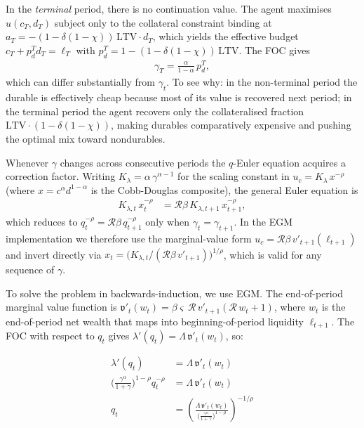 \documentclass[\econtexMain]{subfiles}
\begin{document}
In the \emph{terminal} period, there is no continuation value.  The agent
maximises $u(c_T, d_T)$ subject only to the collateral constraint binding at
$a_T = -(1-\delta(1-\chi))\,\mathrm{LTV}\cdot d_T$, which yields the effective
budget $c_T + p_d^T d_T = \ell_T$ with $p_d^T = 1-(1-\delta(1-\chi))\,\mathrm{LTV}$.  The FOC gives
\begin{align}
	\gamma_T = \frac{\alpha}{1-\alpha}\, p_d^T,
\end{align}
which can differ substantially from $\gamma_t$.  To see why: in the non-terminal
period the durable is effectively cheap because most of its value is recovered
next period; in the terminal period the agent recovers only the collateralised
fraction $\mathrm{LTV}\cdot(1-\delta(1-\chi))$, making durables comparatively
expensive and pushing the optimal mix toward nondurables.

Whenever $\gamma$ changes across consecutive periods the $q$-Euler equation
acquires a correction factor.  Writing $K_\lambda = \alpha\,\gamma^{\alpha-1}$
for the scaling constant in $u_c = K_\lambda\, x^{-\rho}$ (where
$x = c^\alpha d^{1-\alpha}$ is the Cobb-Douglas composite), the general Euler
equation is
\begin{align}
	K_{\lambda,t}\, x_t^{-\rho} &= \mathcal{R}\beta\, K_{\lambda,t+1}\, x_{t+1}^{-\rho},
\end{align}
which reduces to $q_t^{-\rho}=\mathcal{R}\beta\,q_{t+1}^{-\rho}$ only when
$\gamma_t = \gamma_{t+1}$.  In the EGM implementation we therefore use the
marginal-value form $u_c = \mathcal{R}\beta\,v'_{t+1}(\ell_{t+1})$ and invert
directly via $x_t = \bigl(K_{\lambda,t}/(\mathcal{R}\beta\,v'_{t+1})\bigr)^{1/\rho}$,
which is valid for any sequence of $\gamma$.

To solve the problem in backwards-induction, we use EGM. The end-of-period marginal value function is $\mathfrak{v}'_t(w_t) = \beta\varsigma\,\mathcal{R}\,v'_{t+1}(\mathcal{R}\,w_t + 1)$, where $w_t$ is the end-of-period net wealth that maps into beginning-of-period liquidity $\ell_{t+1}$. The FOC with respect to $q_t$ gives $\lambda'(q_t) = \Lambda\,\mathfrak{v}'_t(w_t)$, so:

\begin{align}
	\lambda'(q_t) &= \Lambda\,\mathfrak{v}'_t(w_t)\\
	\Big(\frac{\gamma^\alpha}{1+\gamma}\Big)^{1-\rho} q_t^{-\rho} &= \Lambda\,\mathfrak{v}'_t(w_t)\\
	q_t &= \left(\frac{\Lambda\,\mathfrak{v}'_t(w_t)}{\Big(\frac{\gamma^\alpha}{1+\gamma}\Big)^{1-\rho}}\right)^{-1/\rho}
\end{align}
\end{document}
